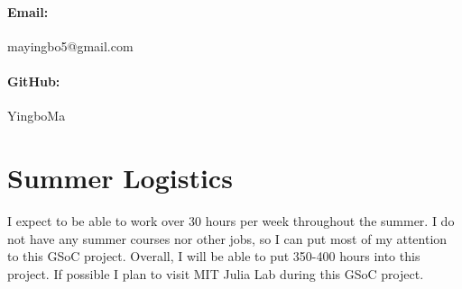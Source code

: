 \documentclass[12pt,a4paper]{article}
\begin{document}
\paragraph{Email:} mayingbo5@gmail.com
\paragraph{GitHub:} YingboMa

\section{Summer Logistics}
I expect to be able to work over 30 hours per week throughout the summer. I do
not have any summer courses nor other jobs, so I can put most of my attention
to this GSoC project. Overall, I will be able to put 350-400 hours into this
project. If possible I plan to visit MIT Julia Lab during this GSoC project.


\end{document}
